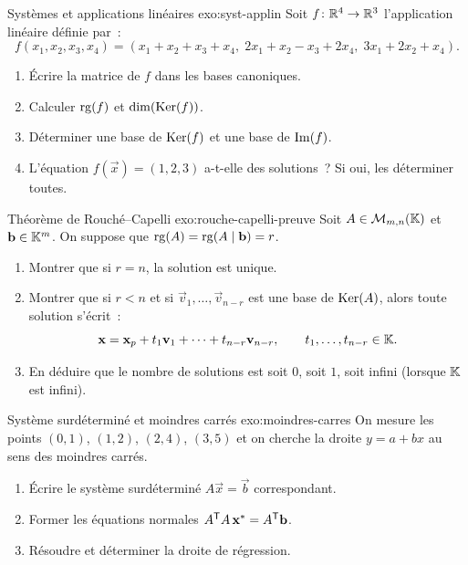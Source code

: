\begin{exercise}{Systèmes et applications linéaires \challenging}{exo:syst-applin}
  Soit $f\colon{\mathbb{R}}^4\to{\mathbb{R}}^3$ l'application linéaire définie par~:
  \[
    f(x_1,x_2,x_3,x_4)=(x_1+x_2+x_3+x_4,\;
    2x_1+x_2-x_3+2x_4,\;
    3x_1+2x_2+x_4).
  \]
  \begin{enumerate}[label=(\alph*)]
    \item Écrire la matrice de $f$ dans les bases canoniques.
    \item Calculer $\operatorname{rg}(f)$ et $\dim(\operatorname{Ker}(f))$.
    \item Déterminer une base de $\operatorname{Ker}(f)$ et une base de $\operatorname{Im}(f)$.
    \item L'équation $f(\vec{x})=(1,2,3)$ a-t-elle des solutions~? Si oui,
      les déterminer toutes.
  \end{enumerate}
\end{exercise}

\begin{exercise}{Théorème de Rouché--Capelli \challenging}{exo:rouche-capelli-preuve}
  Soit $A\in\mathcal{M}_{m,n}({\mathbb{K}})$ et $\mathbf{b}\in{\mathbb{K}}^m$. On suppose que
  $\operatorname{rg}(A)=\operatorname{rg}(A\mid\mathbf{b})=r$.
  \begin{enumerate}[label=(\alph*)]
    \item Montrer que si $r=n$, la solution est unique.
    \item Montrer que si $r<n$ et si $\vec{v}_1,\ldots,\vec{v}_{n-r}$ est
      une base de $\operatorname{Ker}(A)$, alors toute solution s'écrit~:
      \[
        \mathbf{x}=\mathbf{x}_p+t_1\mathbf{v}_1+\cdots+t_{n-r}\mathbf{v}_{n-r},
        \qquad t_1,\ldots,t_{n-r}\in{\mathbb{K}}.
      \]
    \item En déduire que le nombre de solutions est soit $0$, soit $1$,
      soit infini (lorsque ${\mathbb{K}}$ est infini).
  \end{enumerate}
\end{exercise}

\begin{exercise}{Système surdéterminé et moindres carrés \challenging}{exo:moindres-carres}
  On mesure les points $(0,1)$, $(1,2)$, $(2,4)$, $(3,5)$ et on cherche la
  droite $y=a+bx$ au sens des moindres carrés.
  \begin{enumerate}[label=(\alph*)]
    \item Écrire le système surdéterminé $A\vec{x}=\vec{b}$ correspondant.
    \item Former les équations normales ${A}^{\mathsf{T}}A\,\mathbf{x}^{*}={A}^{\mathsf{T}}\mathbf{b}$.
    \item Résoudre et déterminer la droite de régression.
  \end{enumerate}
\end{exercise}

\printindex
